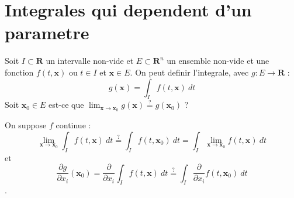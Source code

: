
\chapter{Integrales qui dependent d'un parametre}

Soit $I\subset \mathbf{R}$ un intervalle non-vide et $E\subset \mathbf{R}^{n}$ un ensemble non-vide et une fonction $f(t,\boldsymbol{x})$ ou $t\in I$ et $\boldsymbol{x}\in E$. On peut definir l'integrale, avec $g:E\to \mathbf{R}$ : 
$$
g(\boldsymbol{x})=\int _{I}f(t,\boldsymbol{x})~dt
$$
Soit $\boldsymbol{x}_{0}\in E$ est-ce que $\lim_{ \boldsymbol{x} \to \boldsymbol{x}_{0} }g(\boldsymbol{x})\overset{?}=g(\boldsymbol{x}_{0})$ ?

On suppose $f$ continue :
$$
\lim_{ \boldsymbol{x} \to \boldsymbol{x}_{0} } \int _{I}f(t,\boldsymbol{x})~dt \overset{?}=\int _{I}f(t,\boldsymbol{x}_{0})~dt=\int _{I}\lim_{ \boldsymbol{x} \to \boldsymbol{x}_{0} } f(t,\boldsymbol{x})~dt
$$
et
$$
\frac{ \partial g }{ \partial x_{i} } (\boldsymbol{x}_{0})=\frac{ \partial  }{ \partial x_{i} } \int _{I}f(t,\boldsymbol{x})~dt \overset{?}=\int _{I}\frac{ \partial  }{ \partial x_{i} } f(t,\boldsymbol{x}_{0})~dt
$$.

